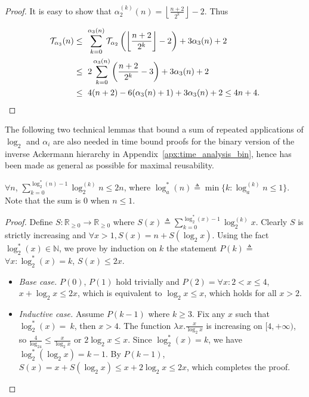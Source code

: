 \begin{proof}
	It is easy to show that $\alpha_2^{(k)}(n) = \left\lfloor \frac{n+2}{2^k} \right\rfloor - 2$. Thus
	
	\begin{equation*}
	\begin{aligned}
		\runtime_{\alpha_3}(n)
		&  \le \ \sum_{k=0}^{\alpha_{3}(n)}\runtime_{\alpha_2}\left(\left\lfloor \frac{n+2}{2^k} \right\rfloor - 2\right) + 3\alpha_{3}(n) + 2 \\
		& \le \ 2\sum_{k=0}^{\alpha_3(n)}\left(\frac{n+2}{2^k} - 3\right) + 3\alpha_3(n) + 2 \\
		& \le \ 4(n + 2) - 6(\alpha_3(n) + 1) + 3\alpha_3(n) + 2 \le 4n + 4.
	\end{aligned}
\end{equation*}
\end{proof}

\noindent The following two technical lemmas that bound a sum of repeated applications of $\log_2$ and $\alpha_i$ are also needed in time bound proofs for the binary version of the inverse Ackermann hierarchy in Appendix~\ref{apx:time_analysis_bin}, hence has been made as general as possible for maximal reusability.

\begin{lem} \label{lem: sum-log-repeat}
	$\forall n$, $\displaystyle \sum_{k = 0}^{\log_2^*(n) - 1}\log_2^{(k)}n \le 2n$, where $\log_a^*(n) \triangleq \min\{k : \log_a^{(k)}n \le 1\}$. Note that the sum is $0$ when $n\le 1$.
\end{lem}

\begin{proof}
	Define $S: \mathbb{R}_{\ge 0}\to \mathbb{R}_{\ge 0}$ where $S(x) \triangleq \sum_{k = 0}^{\log_2^*(x) - 1}\log_2^{(k)}x$. Clearly $S$ is strictly increasing and $\forall x>1, S(x) = n + S(\log_2 x)$. Using the fact $\log_2^*(x)\in \mathbb{N}$, we prove by induction on $k$ the statement $P(k) \triangleq$ $\forall x: \log_2^*(x) = k$, $S(x)\le 2x$.
	\begin{itemize}[leftmargin=*]
		\item \emph{Base case.} $P(0)$, $P(1)$ hold trivially and $P(2) = \forall x: 2 < x \le 4$, $x + \log_2x \le 2x$, which is equivalent to $\log_2x \le x$, which holds for all $x > 2$.
		\item \emph{Inductive case.} Assume $P(k-1)$ where $k\ge 3$. Fix any $x$ such that $\log_2^*(x)=~k$, then $x > 4$. The function $\lambda x.\frac{x}{\log_2x}$ is increasing on $[4, +\infty)$, so $\frac{4}{\log_24} \le \frac{x}{\log_2x}$ or $2\log_2x \le x$. Since $\log_2^*(x) = k$, we have $\log_2^*(\log_2x) = k-1$. By $P(k-1)$, $S(x) = x + S(\log_2x) \le x + 2\log_2x \le 2x$, which completes the proof.
	\end{itemize}
\end{proof}

